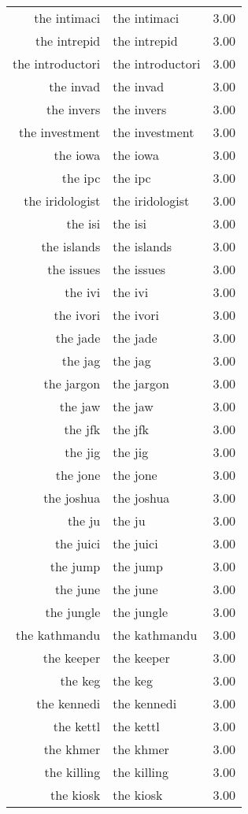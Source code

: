\begin{table}[ht]
\begin{tabular}{rlr}
  the intimaci & the intimaci & 3.00 \\ 
  the intrepid & the intrepid & 3.00 \\ 
  the introductori & the introductori & 3.00 \\ 
  the invad & the invad & 3.00 \\ 
  the invers & the invers & 3.00 \\ 
  the investment & the investment & 3.00 \\ 
  the iowa & the iowa & 3.00 \\ 
  the ipc & the ipc & 3.00 \\ 
  the iridologist & the iridologist & 3.00 \\ 
  the isi & the isi & 3.00 \\ 
  the islands & the islands & 3.00 \\ 
  the issues & the issues & 3.00 \\ 
  the ivi & the ivi & 3.00 \\ 
  the ivori & the ivori & 3.00 \\ 
  the jade & the jade & 3.00 \\ 
  the jag & the jag & 3.00 \\ 
  the jargon & the jargon & 3.00 \\ 
  the jaw & the jaw & 3.00 \\ 
  the jfk & the jfk & 3.00 \\ 
  the jig & the jig & 3.00 \\ 
  the jone & the jone & 3.00 \\ 
  the joshua & the joshua & 3.00 \\ 
  the ju & the ju & 3.00 \\ 
  the juici & the juici & 3.00 \\ 
  the jump & the jump & 3.00 \\ 
  the june & the june & 3.00 \\ 
  the jungle & the jungle & 3.00 \\ 
  the kathmandu & the kathmandu & 3.00 \\ 
  the keeper & the keeper & 3.00 \\ 
  the keg & the keg & 3.00 \\ 
  the kennedi & the kennedi & 3.00 \\ 
  the kettl & the kettl & 3.00 \\ 
  the khmer & the khmer & 3.00 \\ 
  the killing & the killing & 3.00 \\ 
  the kiosk & the kiosk & 3.00 \\ 

\end{tabular}
\end{table}
